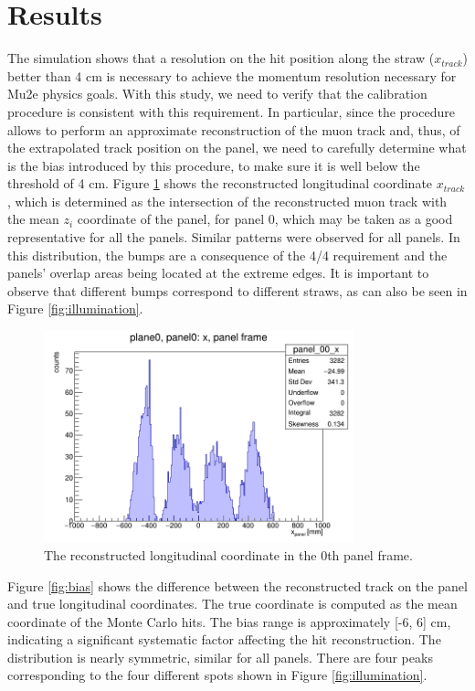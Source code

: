 \section{Results}
The simulation shows that a resolution on the 
hit position along the straw ($x_{track}$) 
better than 4 cm is necessary to achieve the 
momentum resolution necessary for Mu2e physics goals.
With this study, we need to verify that the 
calibration procedure is consistent with 
this requirement. In particular, since the 
procedure allows to perform an approximate reconstruction 
of the muon track and, thus, of the extrapolated track 
position on the panel, we need to carefully determine 
what is the bias introduced by this procedure,  
to make sure it is well below the threshold of 4 cm.  
Figure \ref{fig:recx} shows the reconstructed 
longitudinal coordinate $x_{track}$, which is 
determined as the intersection of the reconstructed 
muon track with the mean $z_i$ 
coordinate of the panel, for panel 0, which may 
be taken as a good representative for all the panels.
Similar patterns were observed for all 
panels. In this distribution, the bumps 
are a consequence of the 4/4 
requirement and the panels' overlap areas 
being located at the extreme edges. 
It is important to observe that 
different bumps correspond to different 
straws, as can also be seen in Figure 
\ref{fig:illumination}.
\begin{figure}[!h]
    \centering
    \includegraphics[width=0.8\textwidth]{figures/png/x_panel0.png}
    \caption[The reconstructed longitudinal coordinate in the 0th panel frame.]{The reconstructed longitudinal coordinate in the 0th panel frame.}
    \label{fig:recx}
\end{figure}
Figure \ref{fig:bias} shows the difference   
between the reconstructed track on the panel 
and true longitudinal coordinates. 
The true coordinate is computed as the mean coordinate 
of the Monte Carlo hits. 
The bias range is approximately [-6, 6] cm, 
indicating a significant systematic factor 
affecting the hit reconstruction. The 
distribution is nearly symmetric, similar 
for all panels. 
There are four peaks corresponding to the 
four different spots shown in Figure 
\ref{fig:illumination}.

